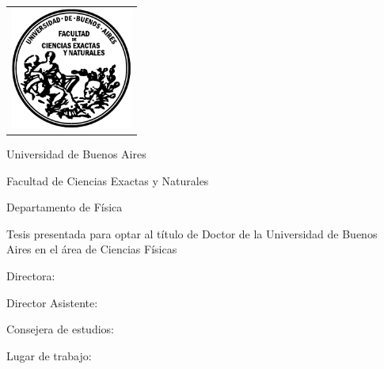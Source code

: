 \newcommand{\HRule}{\rule{\linewidth}{0.2mm}}
%
\thispagestyle{empty}

\begin{center}\leavevmode

\vspace{-2cm}

\begin{tabular}{l}
\includegraphics[width=4cm]{logofcen.pdf}
\end{tabular}


{\large \sc Universidad de Buenos Aires

Facultad de Ciencias Exactas y Naturales

Departamento de Física}

\vspace{6.0cm}


\begin{huge}
\textbf{\tituloTesis}
\end{huge}

\vspace{2cm}

{\large Tesis presentada para optar al título de Doctor de la Universidad de Buenos Aires en el área de Ciencias Físicas}

\vspace{2cm}

{\Large \autor}

\end{center}

\vfill

{\large

{Directora: \director}

\vspace{.2cm}

{Director Asistente: \codirector}

\vspace{.2cm}

{Consejera de estudios: \consejero}

\vspace{.2cm}

{Lugar de trabajo: \lugar}

\vspace{.2cm}

\fecha
}

\newpage\thispagestyle{empty}

